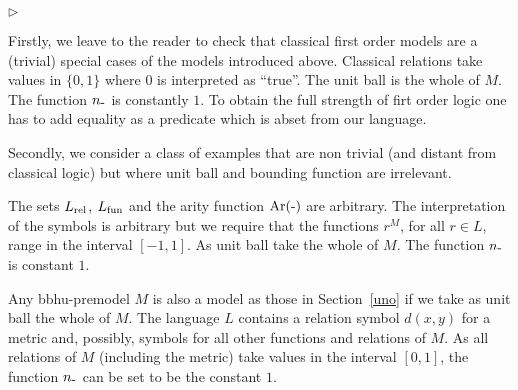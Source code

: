 \documentclass[12pt,letterpaper,oneside,reqno]{amsart}
\newcommand{\mylabel}[1]{{#1}\hfill}
\renewenvironment{itemize}
  {\begin{list}{$\triangleright$}{%
   \setlength{\parskip}{0mm}
   \setlength{\topsep}{.2\baselineskip}
   \setlength{\rightmargin}{0mm}
   \setlength{\listparindent}{0mm}
   \setlength{\itemindent}{0mm}
   \setlength{\labelwidth}{3ex}
   \setlength{\itemsep}{.2\baselineskip}
   \setlength{\parsep}{.2\baselineskip}
   \setlength{\partopsep}{0mm}
   \setlength{\labelsep}{1ex}
   \setlength{\leftmargin}{\labelwidth+\labelsep}
   \let\makelabel\mylabel}}{%
   \end{list}}
\theoremstyle{plain}
\theoremstyle{remark}
\begin{document}
\begin{itemize}
  \item [1.] Firstly, we leave to the reader to check that classical first order models are a (trivial) special cases of the models introduced above.
  Classical relations take values in $\{0,1\}$ where $0$ is interpreted as ``true''.
  The unit ball is the whole of $M$. 
  The function $n_{\mbox-}$ is constantly $1$.
  To obtain the full strength of firt order logic one has to add equality as a predicate which is abset from our language.

  \item [2.] Secondly, we consider a class of examples that are non trivial (and distant from classical logic) but where unit ball and bounding function are irrelevant.
  
  The sets $L_{\rm rel}$, $L_{\rm fun}$ and the arity function ${\rm Ar}(\mbox-)$ are arbitrary.
  The interpretation of the symbols is arbitrary but we require that the functions $r^M$, for all $r\in L$, range in the interval $[-1,1]$.
  As unit ball take the whole of $M$.
  The function $n_{\mbox-}$ is constant $1$.

  \item [3.] Any {\sc bbhu}-premodel $M$ is also a model as those in Section~\ref{uno} if we take as unit ball the whole of $M$.
  The language $L$ contains a relation symbol $d(x,y)$ for a metric and, possibly, symbols for all other functions and relations of $M$.
  As all relations of $M$ (including the metric) take values in the interval $[0,1]$, the function $n_{\mbox-}$ can be set to be the constant $1$.
  

  

\end{itemize}
\end{document}
